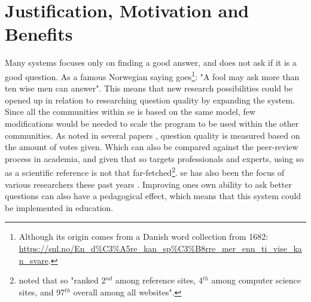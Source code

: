 \section{Justification, Motivation and Benefits}
\label{sec:justification}
Many systems focuses only on finding a good answer, and does not ask if it is a good question.
As a famous Norwegian saying goes\footnote{
	Although its origin comes from a Danish word collection from 1682: 
	\url{https://snl.no/En\_d\%C3\%A5re\_kan\_sp\%C3\%B8rre\_mer\_enn\_ti\_vise\_kan\_svare}.
}: "A fool may ask more than ten wise men can answer".
This means that new research possibilities could be opened up in relation to researching question quality by expanding the system. 
Since all the communities within \gls{se} is based on the same model, few modifications would be needed to scale the program to be used within the other communities.
As noted in several papers \cite{Movshovitz-Attias2013, Nasehi2012, Posnett2012, Sewak2010, Treude2011, Yang2014}, question quality is measured based on the amount of votes given. 
Which can also be compared against the peer-review process in academia, and given that \gls{so} targets professionals and experts, 
using \gls{so} as a scientific reference is not that far-fetched\footnote{
	 \citet[p.~1]{Posnett2012} noted that \gls{so} "ranked 2$^{nd}$ among reference sites, 4$^{th}$ among computer science sites, and 97$^{th}$ overall among all websites".
	 }.
\gls{se} has also been the focus of various researchers these past years \cite{Vasilescu2012}.
Improving ones own ability to ask better questions can also have a pedagogical effect, which means that this system could be implemented in education. 

